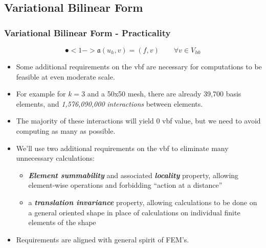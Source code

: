\documentclass[compress]{beamer}
\begin{document}
\subsection{Variational Bilinear Form}

\begin{frame}
  \frametitle{Variational Bilinear Form - Practicality}
  $$\spot<1->{\mathfrak{a}}(u_h,v) = (f,v)\quad\quad \forall{v} \in V_{h0}$$
  \begin{itemize}[<+->]
    \item Some additional requirements on the vbf are necessary for computations to be feasible at even moderate scale.
    \item For example for $k=3$ and a 50x50 mesh, there are already 39,700 basis elements, and \emph{1,576,090,000} 
      \emph{interactions} between elements. 
    \item The majority of these interactions will yield $0$ vbf value, but we need to avoid computing as many as possible.
    \item We'll use two additional requirements on the vbf to eliminate many unnecessary calculations:
        \begin{itemize}[<+->]
          \item \emph{\textbf{Element summability}} and associated \emph{\textbf{locality}} property, allowing element-wise operations and
            forbidding ``action at a distance''
          \item a \emph{\textbf{translation invariance}} property, allowing calculations to be done on a general oriented shape in place of
            calculations on individual finite elements of the shape
        \end{itemize}
    \item Requirements are aligned with general spirit of FEM's.
  \end{itemize}
\end{frame}
\end{document}
